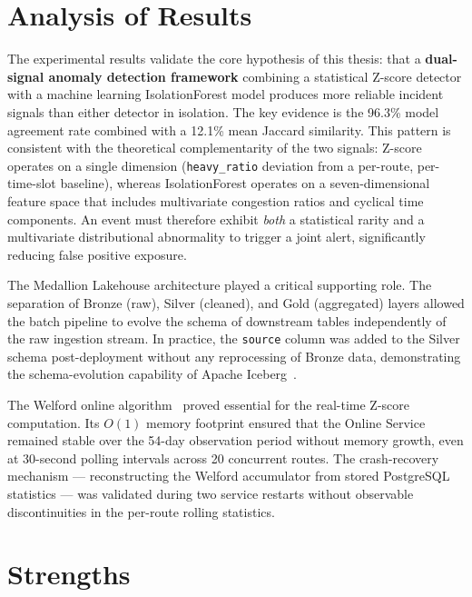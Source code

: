 \section{Analysis of Results}
\label{sec:discussion-analysis}

The experimental results validate the core hypothesis of this thesis: that a
\textbf{dual-signal anomaly detection framework} combining a statistical
Z-score detector with a machine learning IsolationForest model produces more
reliable incident signals than either detector in isolation. The key evidence
is the 96.3\% model agreement rate combined with a 12.1\% mean Jaccard
similarity. This pattern is consistent with the theoretical complementarity of
the two signals: Z-score operates on a single dimension (\texttt{heavy\_ratio}
deviation from a per-route, per-time-slot baseline), whereas IsolationForest
operates on a seven-dimensional feature space that includes multivariate
congestion ratios and cyclical time components. An event must therefore exhibit
\textit{both} a statistical rarity and a multivariate distributional
abnormality to trigger a joint alert, significantly reducing false positive
exposure.

The Medallion Lakehouse architecture played a critical supporting role. The
separation of Bronze (raw), Silver (cleaned), and Gold (aggregated) layers
allowed the batch pipeline to evolve the schema of downstream tables
independently of the raw ingestion stream. In practice, the \texttt{source}
column was added to the Silver schema post-deployment without any reprocessing
of Bronze data, demonstrating the schema-evolution capability of Apache
Iceberg~\cite{iceberg_paper}.

The Welford online algorithm~\cite{welford1962} proved essential for the
real-time Z-score computation. Its $O(1)$ memory footprint ensured that the
Online Service remained stable over the 54-day observation period without
memory growth, even at 30-second polling intervals across 20 concurrent routes.
The crash-recovery mechanism --- reconstructing the Welford accumulator from
stored PostgreSQL statistics --- was validated during two service restarts
without observable discontinuities in the per-route rolling statistics.

\section{Strengths}
\label{sec:strengths}

